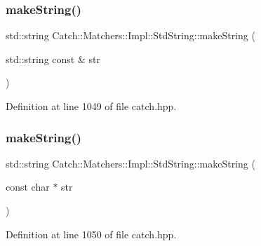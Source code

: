 \subsubsection{\texorpdfstring{make\+String()}{makeString()}\hspace{0.1cm}{\footnotesize\ttfamily [1/2]}}
{\footnotesize\ttfamily std\+::string Catch\+::\+Matchers\+::\+Impl\+::\+Std\+String\+::make\+String (\begin{DoxyParamCaption}\item[{std\+::string const \&}]{str }\end{DoxyParamCaption})\hspace{0.3cm}{\ttfamily [inline]}}



Definition at line 1049 of file catch.\+hpp.

\hypertarget{namespace_catch_1_1_matchers_1_1_impl_1_1_std_string_a42a104fb88baf158ed3b7d0d422afdaa}{}\label{namespace_catch_1_1_matchers_1_1_impl_1_1_std_string_a42a104fb88baf158ed3b7d0d422afdaa} 
\subsubsection{\texorpdfstring{make\+String()}{makeString()}\hspace{0.1cm}{\footnotesize\ttfamily [2/2]}}
{\footnotesize\ttfamily std\+::string Catch\+::\+Matchers\+::\+Impl\+::\+Std\+String\+::make\+String (\begin{DoxyParamCaption}\item[{const char $\ast$}]{str }\end{DoxyParamCaption})\hspace{0.3cm}{\ttfamily [inline]}}



Definition at line 1050 of file catch.\+hpp.

